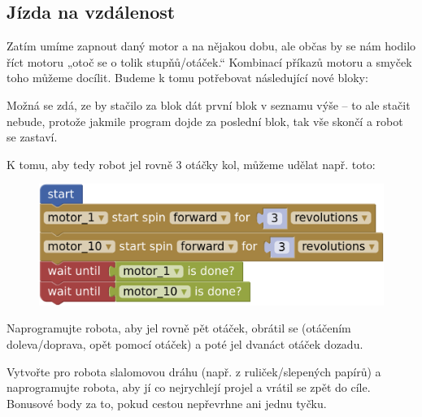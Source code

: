 \documentclass[../main.tex]{subfiles}
\begin{document}
	\subsection{Jízda na vzdálenost}\label{cha:distanceride}
	Zatím umíme zapnout daný motor a na nějakou dobu, ale občas by se nám hodilo říct motoru „otoč se o tolik stupňů/otáček.“ Kombinací příkazů motoru a smyček toho můžeme docílit. Budeme k tomu potřebovat následující nové bloky:
	\begin{itemize}
		\blockMotorDistance
		\blockWaitUntil
		\blockMotorDone
	\end{itemize}

	Možná se zdá, ze by stačilo za \blockStartImage blok dát první blok v seznamu výše -- to ale stačit nebude, protože jakmile program dojde za poslední blok, tak vše skončí a robot se zastaví.

	K tomu, aby tedy robot jel rovně 3 otáčky kol, můžeme udělat např. toto:

	\begin{figure}[h!]
		\centering
		\begin{minipage}{0.5\textwidth}
			\includegraphics[width=\linewidth]{../Images/02/sol.png}
		\end{minipage}
	\end{figure}

	\begin{question}
		Naprogramujte robota, aby jel rovně pět otáček, obrátil se (otáčením doleva/doprava, opět pomocí otáček) a poté jel dvanáct otáček dozadu.
	\end{question}

	\begin{question*}
		Vytvořte pro robota slalomovou dráhu (např. z ruliček/slepených papírů) a naprogramujte robota, aby jí co nejrychlejí projel a vrátil se zpět do cíle. Bonusové body za to, pokud cestou nepřevrhne ani jednu tyčku.
	\end{question*}
\end{document}
